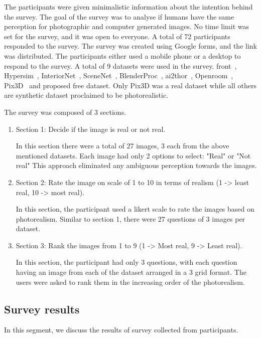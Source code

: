 The participants were given minimalistic information about the intention behind the survey.
The goal of the survey was to analyse if humans have the same perception for photographic and computer generated images.
No time limit was set for the survey, and it was open to everyone.
A total of 72 participants responded to the survey.
The survey was created using Google forms, and the link was distributed.
The participants either used a mobile phone or a desktop to respond to the survey.
A total of 9 datasets were used in the survey.
\gls{front}~\cite{Fu20203DFRONT3F}, Hypersim~\cite{Roberts2020HypersimAP}, InteriorNet~\cite{InteriorNet18}, SceneNet~\cite{McCormac:etal:ICCV2017}, BlenderProc~\cite{denninger2019blenderproc},
\gls{ai2thor}~\cite{kolve2019ai2thor}, Openroom~\cite{li2021openrooms}, Pix3D~\cite{pix3d} and proposed \gls{free} dataset.
Only Pix3D was a real dataset while all others are synthetic dataset proclaimed to be photorealistic.

The survey was composed of 3 sections.
\begin{enumerate}
    \item Section 1: Decide if the image is real or not real.

    In this section there were a total of 27 images, 3 each from the above mentioned datasets.
    Each image had only 2 options to select: "Real" or "Not real"
    This approach eliminated any ambiguous perception towards the images.

    \item Section 2: Rate the image on scale of 1 to 10 in terms of realism (1 -> least real, 10 -> most real).

    In this section, the participant used a likert scale to rate the images based on photorealism.
    Similar to section 1, there were 27 questions of 3 images per dataset.

    \item Section 3: Rank the images from 1 to 9 (1 -> Most real, 9 -> Least real).

    In this section, the participant had only 3 questions, with each question having an image from each of the dataset arranged in a 3 grid format.
    The users were asked to rank them in the increasing order of the photorealism.
\end{enumerate}

\subsection{Survey results}\label{subsec:survey-results}
In this segment, we discuss the results of survey collected from participants.

